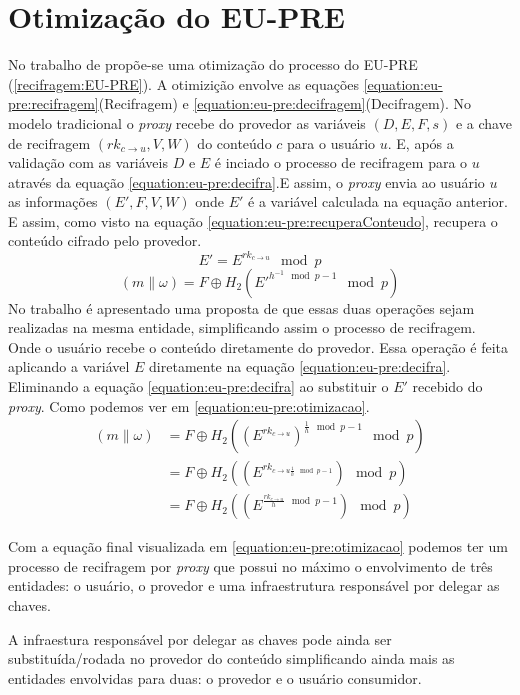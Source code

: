 \section{Otimização do \textbf{EU-PRE}}
\label{recifragem:otimizacao}
No trabalho de \cite{mannes2016controle} propõe-se uma otimização do processo do EU-PRE (\ref{recifragem:EU-PRE}). A otimizição envolve as equações \ref{equation:eu-pre:recifragem}(Recifragem) e \ref{equation:eu-pre:decifragem}(Decifragem). No modelo tradicional o \emph{proxy} recebe do provedor as variáveis $(D,E,F,s)$ e a chave de recifragem $(rk_{c\rightarrow u},V,W)$ do conteúdo $c$ para o usuário $u$. E, após a validação com as variáveis $D$ e $E$ é inciado o processo de recifragem para o $u$ através da equação \ref{equation:eu-pre:decifra}.E assim, o \emph{proxy} envia ao usuário $u$ as informações $(E',F,V,W)$ onde $E'$ é a variável calculada na equação anterior. E assim, como visto na equação \ref{equation:eu-pre:recuperaConteudo}, recupera o conteúdo cifrado pelo provedor.
\begin{equation}
\label{equation:eu-pre:decifra}
    E' = E^{rk_{c\rightarrow u}}\mod{p}
\end{equation}
\begin{equation}
\label{equation:eu-pre:recuperaConteudo}
    (m\parallel \omega) = F \oplus H_2({E'}^{h^{-1}\mod{p-1}} \mod{p})
\end{equation}
No trabalho é apresentado uma proposta de que essas duas operações sejam realizadas na mesma entidade, simplificando assim o processo de recifragem. Onde o usuário recebe o conteúdo diretamente do provedor. Essa operação é feita aplicando a variável $E$ diretamente na equação \ref{equation:eu-pre:decifra}. Eliminando a equação \ref{equation:eu-pre:decifra} ao substituir o $E'$ recebido do \emph{proxy}. Como podemos ver em \ref{equation:eu-pre:otimizacao}.
\begin{equation} \label{equation:eu-pre:otimizacao}
    \begin{split}
        (m\parallel \omega) & = F \oplus H_2({({E}^{rk_{c\rightarrow u}})^{\frac{1}{h}\mod{p-1}}} \mod{p}) \\
 & = F \oplus H_2({({E}^{rk_{c\rightarrow u{\frac{1}{h}\mod{p-1}}}})} \mod{p}) \\
 & = F \oplus H_2({({E}^{{\frac{rk_{c\rightarrow u}}{h}\mod{p-1}}})} \mod{p})
    \end{split}
\end{equation}

Com a equação final visualizada em \ref{equation:eu-pre:otimizacao} podemos ter um processo de recifragem por \emph{proxy} que possui no máximo o envolvimento de três entidades: o usuário, o provedor e uma infraestrutura responsável por delegar as chaves.

A infraestura responsável por delegar as chaves pode ainda ser substituída/rodada no provedor do conteúdo simplificando ainda mais as entidades envolvidas para duas: o provedor e o usuário consumidor.